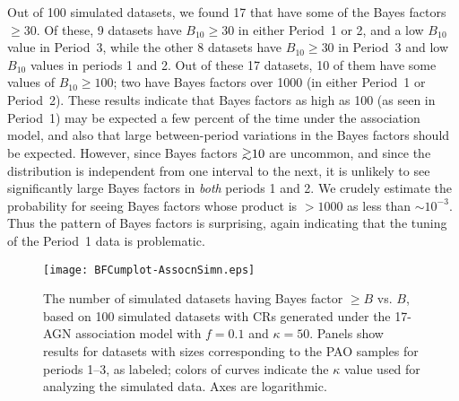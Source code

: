 Out of 100 simulated datasets, we found 17 that have some of the Bayes
factors $\geq 30$.  Of these, 9 datasets have $B_{10}\geq 30$ in either
Period~1 or 2, and a low $B_{10}$ value in Period~3, while the other 8
datasets have $B_{10}\geq 30$ in Period~3 and low $B_{10}$ values in periods
1 and 2.  Out of these 17 datasets, 10 of them have some values of
$B_{10}\geq 100$; two have Bayes factors over 1000 (in either Period~1
or Period~2).
These results indicate that Bayes factors as high as 100 (as seen in Period~1)
may be expected a few percent of the time under the association model, and
also that large between-period variations in the Bayes factors should be
expected.  However, since Bayes factors $\gta 10$ are uncommon, and since the
distribution is independent from one interval to the next, it is unlikely to
see significantly large Bayes factors in {\em both} periods 1 and 2.  We
crudely estimate the probability for seeing Bayes factors whose product
is $> 1000$ as less than $\sim 10^{-3}$.  Thus the pattern of Bayes factors is
surprising, again indicating that the tuning of the Period~1 data is
problematic.

\begin{figure}
\centerline{\texttt{[image: BFCumplot-AssocnSimn.eps]}}
\caption{The number of simulated datasets having Bayes factor $\geq B$
vs. $B$, based on 100 simulated datasets with CRs generated under the
17-AGN association model with $f=0.1$ and $\kappa=50$.  Panels show
results for datasets with sizes corresponding to the PAO samples for
periods 1--3, as labeled; colors of curves indicate the $\kappa$ value
used for analyzing the simulated data.  Axes are logarithmic.}
\label{fig:assocCumBF}
\end{figure}
